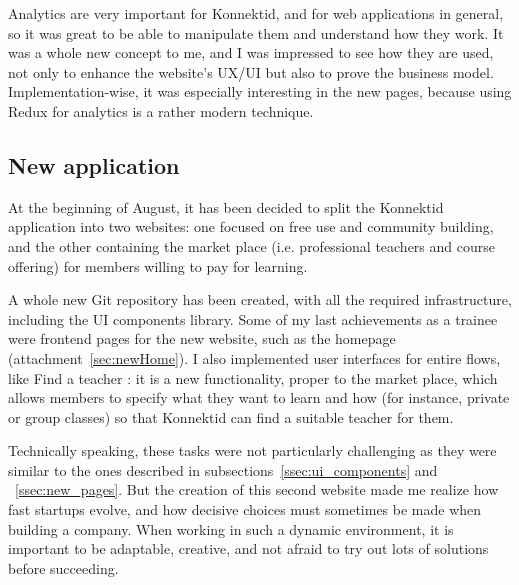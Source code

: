 Analytics are very important for Konnektid, and for web applications in general, so it was great to be able to manipulate them and understand how they work. It was a whole new concept to me, and I was impressed to see how they are used, not only to enhance the website's UX/UI but also to prove the business model. Implementation-wise, it was especially interesting in the new pages, because using Redux for analytics is a rather modern technique.

\subsection{New application}
\label{ssec:newApp}

At the beginning of August, it has been decided to split the Konnektid application into two websites: one focused on free use and community building, and the other containing the market place (i.e. professional teachers and course offering) for members willing to pay for learning.

A whole new Git repository has been created, with all the required infrastructure, including the UI components library. Some of my last achievements as a trainee were frontend pages for the new website, such as the homepage ({\sc attachment}~\ref{sec:newHome}). I also implemented user interfaces for entire flows, like \guillemotleft{} Find a teacher \guillemotright{}: it is a new functionality, proper to the market place, which allows members to specify what they want to learn and how (for instance, private or group classes) so that Konnektid can find a suitable teacher for them.

Technically speaking, these tasks were not particularly challenging as they were similar to the ones described in {\sc subsections}~\ref{ssec:ui_components} and ~\ref{ssec:new_pages}. But the creation of this second website made me realize how fast startups evolve, and how decisive choices must sometimes be made when building a company. When working in such a dynamic environment, it is important to be adaptable, creative, and not afraid to try out lots of solutions before succeeding.
